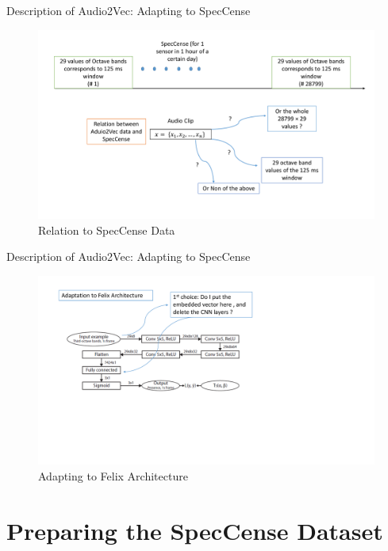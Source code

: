 \documentclass{Beamer}
\begin{document}
\begin{frame}[t]{Description of Audio2Vec: Adapting to SpecCense}

\begin{figure}[h]
\includegraphics[scale=0.35]{Figures/Relation_Audio2Vec_SpecCense.pdf}
\caption{Relation to SpecCense Data}
\end{figure}

\end{frame}



\begin{frame}[t]{Description of Audio2Vec: Adapting to SpecCense}


\begin{figure}[h]
\includegraphics[scale=0.45]{Figures/Felix_Archi}
\caption{Adapting to Felix Architecture}
\end{figure}

\end{frame}


\section{Preparing the SpecCense Dataset}
\end{document}
